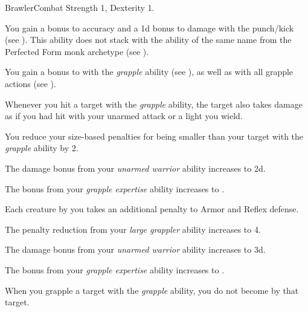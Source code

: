     \begin{feat}{Brawler}{Combat}
        \featpre Strength 1, Dexterity 1.

         You gain a  bonus to accuracy and a \plus1d bonus to damage with the punch/kick  (see ).
        This ability does not stack with the ability of the same name from the Perfected Form monk archetype (see ).

         You gain a  bonus to  with the \textit{grapple} ability (see ), as well as with all grapple actions (see ).

         Whenever you hit a target with the \textit{grapple} ability, the target also takes damage as if you had hit with your unarmed attack or a light  you wield.

         You reduce your size-based penalties for being smaller than your target with the \textit{grapple} ability by 2.

         The damage bonus from your \textit{unarmed warrior} ability increases to \plus2d.

         The bonus from your \textit{grapple expertise} ability increases to .

         Each creature \grappled by you takes an additional  penalty to Armor and Reflex defense.

         The penalty reduction from your \textit{large grappler} ability increases to 4.

         The damage bonus from your \textit{unarmed warrior} ability increases to \plus3d.

         The bonus from your \textit{grapple expertise} ability increases to .

         When you grapple a target with the \textit{grapple} ability, you do not become \grappled by that target.
    \end{feat}

